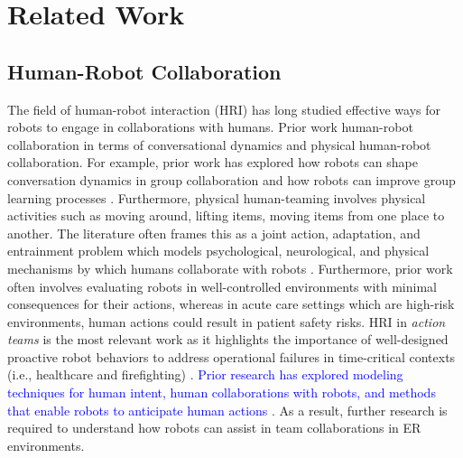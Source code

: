 \section{Related Work}

\subsection{Human-Robot Collaboration} 

The field of human-robot interaction (HRI) has long studied effective ways for robots to engage in collaborations with humans. 
Prior work human-robot collaboration in terms of conversational dynamics and physical human-robot collaboration.%
For example, prior work has explored how robots can shape conversation dynamics in group collaboration \cite{tennent2019micbot} and how robots can improve group learning processes \cite{alves2019empathic}. 
Furthermore, physical human-teaming involves physical activities such as moving around, lifting items, moving items from one place to another. 
The literature often frames this as a joint action, adaptation, and entrainment problem which models psychological, neurological, and physical mechanisms by which humans collaborate with robots \cite{fourie2022joint,iqbal2016movement,iqbal2017coordination}. 
Furthermore, prior work often involves evaluating robots in well-controlled environments with minimal consequences for their actions, whereas in acute care settings which are high-risk environments, human actions could result in patient safety risks. 
HRI in \textit{action teams} is the most relevant work as it highlights the importance of well-designed proactive robot behaviors to address operational failures in time-critical contexts (i.e., healthcare and firefighting) \cite{jamshad2024taking}. 
\textcolor{blue}{Prior research has explored modeling techniques for human intent, human collaborations with robots, and methods that enable robots to anticipate human actions} \cite{levine2014concurrent,nikolaidis2013human,dominey2008anticipation,hoffman2007effects}.
As a result, further research is required to understand how robots can assist in team collaborations in ER environments.


